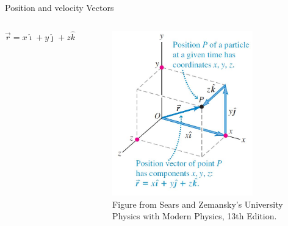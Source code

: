 \documentclass[]{beamer}
\begin{document}
\begin{frame}
    Position and velocity Vectors
    \vspace{3mm}
 
    \begin{columns}[c]
        \column{2in}  %
       
        \begin{equation}
          \vec{r}=x\hat{\imath}+y\hat{\jmath}+z\hat{k}
         \end{equation}
      
  
    
        \column{2.5in}
        
        \begin{figure}[h!]  
       \includegraphics[width=0.8\textwidth]{images/7.jpg}
        \caption{ {\tiny Figure from Sears and Zemansky's University Physics 
        with Modern Physics, 13th Edition.} }
     \end{figure}
     
     
     
        \end{columns}
    
\end{frame}


\end{document}
